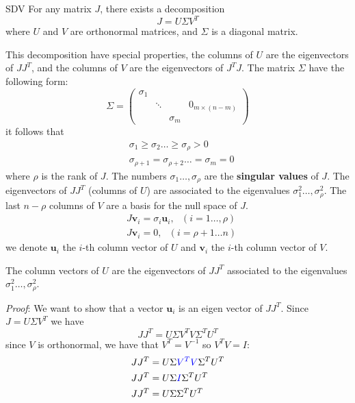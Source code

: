 \documentclass[10pt, a4paper]{report}
\begin{document}
\begin{boxdefinition}{SDV}{}
    For any matrix $J$, there exists a decomposition\begin{equation}
        J=U\Sigma V^T 
    \end{equation}
    where $U$ and $V$ are orthonormal matrices, and $\Sigma$ is a diagonal matrix.
\end{boxdefinition}
This decomposition have special properties, the columns of $U$ are the eigenvectors of $JJ^T$, and the columns of $V$ are the eigenvectors of $J^TJ$. The matrix $\Sigma$ have the following form:\begin{equation}
    \Sigma=\begin{pmatrix}
        \sigma_1 & & & \\ 
        & \ddots & & 0_{m\times (n-m)}\\ 
        & & \sigma_m & 
    \end{pmatrix}
\end{equation}
it follows that\begin{align}
    &\sigma_1\ge\sigma_2\dots \ge \sigma_\rho>0\\
    &\sigma_{\rho+1}= \sigma_{\rho+2}\dots = \sigma_{m}=0
\end{align}
where $\rho$ is the rank of $J$. The numbers $\sigma_1\dots ,\sigma_\rho$ are the \textbf{singular values} of $J$. The eigenvectors of $JJ^T$ (columns of $U$) are associated to the eigenvalues $\sigma_1^2\dots,\sigma_\rho^2$. The last $n-\rho$ columns of $V$ are a basis for the null space of $J$.\begin{align}
    &J\mathbf v_i=\sigma_i\mathbf u_i, \ \ \ (i=1\dots, \rho)\\ 
    &J\mathbf  v_i=0, \ \ \ (i=\rho+1\dots n)
\end{align}
we denote $\mathbf u_i$ the $i$-th column vector of $U$ and $\mathbf v_i$ the $i$-th column vector of $V$. 
\begin{boxproposition}{}{}
    The column vectors of $U$ are the eigenvectors of $JJ^T$ associated to the eigenvalues $\sigma_1^2\dots,\sigma_\rho^2$.
\end{boxproposition}
\noindent\textit{Proof}: We want to show that a  vector $\mathbf u_i$ is an eigen vector of $JJ^T$. Since $J=U\Sigma V^T$ we have\begin{equation}
    JJ^T=U\Sigma V^T V \Sigma^T U^T
\end{equation}
since $V$ is orthonormal, we have that $V^T=V^{-1}$ so $V^TV=I$:\begin{align}
    &JJ^T=U\Sigma \color{blue}V^T V\color{black}\Sigma^T U^T\\
    &JJ^T=U\Sigma \color{blue}I\color{black}\Sigma^T U^T\\
    &JJ^T=U\Sigma\Sigma^T U^T
\end{align}
\end{document}
